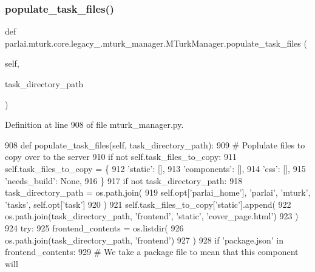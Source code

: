\subsubsection{\texorpdfstring{populate\+\_\+task\+\_\+files()}{populate\_task\_files()}}
{\footnotesize\ttfamily def parlai.\+mturk.\+core.\+legacy\+\_.\+mturk\+\_\+manager.\+M\+Turk\+Manager.\+populate\+\_\+task\+\_\+files (\begin{DoxyParamCaption}\item[{}]{self,  }\item[{}]{task\+\_\+directory\+\_\+path }\end{DoxyParamCaption})}



Definition at line 908 of file mturk\+\_\+manager.\+py.


\begin{DoxyCode}
908     \textcolor{keyword}{def }populate\_task\_files(self, task\_directory\_path):
909         \textcolor{comment}{# Poplulate files to copy over to the server}
910         \textcolor{keywordflow}{if} \textcolor{keywordflow}{not} self.task\_files\_to\_copy:
911             self.task\_files\_to\_copy = \{
912                 \textcolor{stringliteral}{'static'}: [],
913                 \textcolor{stringliteral}{'components'}: [],
914                 \textcolor{stringliteral}{'css'}: [],
915                 \textcolor{stringliteral}{'needs\_build'}: \textcolor{keywordtype}{None},
916             \}
917         \textcolor{keywordflow}{if} \textcolor{keywordflow}{not} task\_directory\_path:
918             task\_directory\_path = os.path.join(
919                 self.opt[\textcolor{stringliteral}{'parlai\_home'}], \textcolor{stringliteral}{'parlai'}, \textcolor{stringliteral}{'mturk'}, \textcolor{stringliteral}{'tasks'}, self.opt[\textcolor{stringliteral}{'task'}]
920             )
921         self.task\_files\_to\_copy[\textcolor{stringliteral}{'static'}].append(
922             os.path.join(task\_directory\_path, \textcolor{stringliteral}{'frontend'}, \textcolor{stringliteral}{'static'}, \textcolor{stringliteral}{'cover\_page.html'})
923         )
924         \textcolor{keywordflow}{try}:
925             frontend\_contents = os.listdir(
926                 os.path.join(task\_directory\_path, \textcolor{stringliteral}{'frontend'})
927             )
928             \textcolor{keywordflow}{if} \textcolor{stringliteral}{'package.json'} \textcolor{keywordflow}{in} frontend\_contents:
929                 \textcolor{comment}{# We take a package file to mean that this component will}

\end{DoxyCode}
